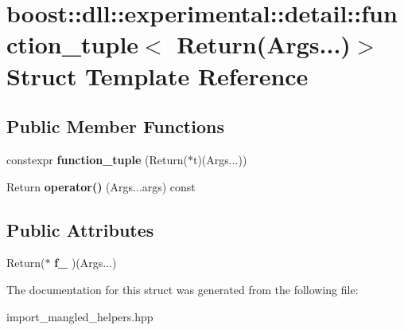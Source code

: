 \hypertarget{a00109}{}\section{boost\+:\+:dll\+:\+:experimental\+:\+:detail\+:\+:function\+\_\+tuple$<$ Return(Args...)$>$ Struct Template Reference}
\label{a00109}
\subsection*{Public Member Functions}
\begin{DoxyCompactItemize}
\item 
constexpr {\bfseries function\+\_\+tuple} (Return($\ast$t)(Args...))\hypertarget{a00109_ab85660385eab5c21aaa4e70317680ce5}{}\label{a00109_ab85660385eab5c21aaa4e70317680ce5}

\item 
Return {\bfseries operator()} (Args...\+args) const \hypertarget{a00109_a19c9137a765f54bc0be74a57b878e628}{}\label{a00109_a19c9137a765f54bc0be74a57b878e628}

\end{DoxyCompactItemize}
\subsection*{Public Attributes}
\begin{DoxyCompactItemize}
\item 
Return($\ast$ {\bfseries f\+\_\+} )(Args...)\hypertarget{a00109_a16864d5b5d7f82eba86c331ecc3fc5d0}{}\label{a00109_a16864d5b5d7f82eba86c331ecc3fc5d0}

\end{DoxyCompactItemize}


The documentation for this struct was generated from the following file\+:\begin{DoxyCompactItemize}
\item 
import\+\_\+mangled\+\_\+helpers.\+hpp\end{DoxyCompactItemize}
